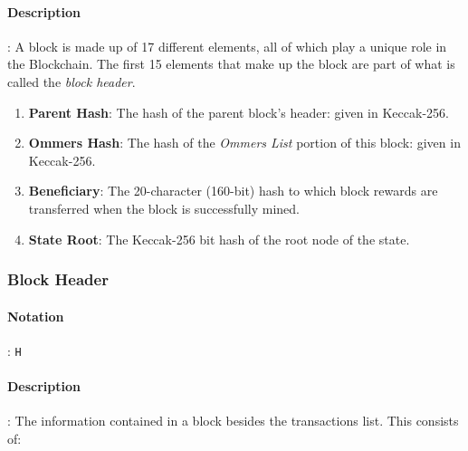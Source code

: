 \documentclass[10pt,a4paper,leqno,bibliography=totoc]{scrartcl}
\newenvironment{alphafootnotes}
{\par\edef\savedfootnotenumber{\number\value{footnote}}
\renewcommand{\thefootnote}{\alph{footnote}}
\setcounter{footnote}{0}}
{\par\setcounter{footnote}{\savedfootnotenumber}}
\begin{document}
\begin{alphafootnotes}
\begin{multicols*}{2}
			\paragraph{Description}: A block is made up of 17 different elements, all of which play a unique role in the Blockchain. The first 15 elements that make up the block are part of what is called the \textsl{block header}. 

			\begin{enumerate}
				\item \textbf{Parent Hash}: The hash of the parent block's header: given in Keccak-256.
				\item \textbf{Ommers Hash}: The hash of the \textsl{Ommers List} portion of this block: given in Keccak-256.
				\item \textbf{Beneficiary}: The 20-character (160-bit) hash to which block rewards are transferred when the block is successfully mined.
				\item \textbf{State Root}: The Keccak-256 bit hash of the root node of the state. 
			
			\end{enumerate}
				\subsubsection{Block Header}
				\paragraph{Notation}: \texttt{H} 
				\paragraph{Description}: The information contained in a block besides the transactions list. This consists of:


\end{multicols*}
\end{alphafootnotes}
\end{document}
